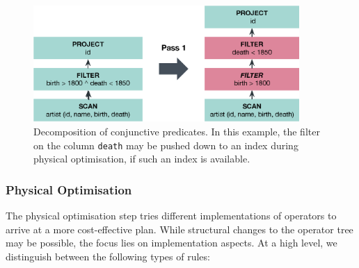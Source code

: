 \begin{figure}[bt]
    \centering
    \includegraphics[width=0.9\textwidth]{figures/logical-rule-conjunction}
    \caption{Decomposition of conjunctive predicates. In this example, the filter on the column \texttt{death} may be pushed down to an index during physical optimisation, if such an index is available.}
    \label{figure:cottontail_logical_rule_conjunction}
\end{figure}

\subsubsection{Physical Optimisation}

The physical optimisation step tries different implementations of operators to arrive at a more cost-effective plan. While structural changes to the operator tree may be possible, the focus lies on implementation aspects.  At a high level, we distinguish between the following types of rules:

